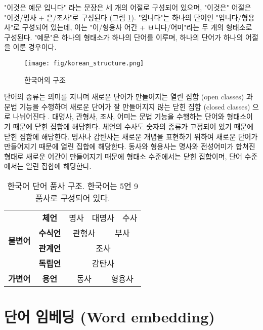 \documentclass[oneside, ko,phd]{snuthesis_utf8_kor}
\begin{document}
"이것은 예문 입니다" 라는 문장은 세 개의 어절로 구성되어 있으며, "이것은" 어절은 "이것/명사 + 은/조사"로 구성된다  (그림 \ref{tab:korean_tag}).
"입니다"는 하나의 단어인 "입니다/형용사"로 구성되어 있는데, 이는 "이/형용사 어간 + ㅂ니다/어미"라는 두 개의 형태소로 구성된다.
"예문"은 하나의 형태소가 하나의 단어를 이루며, 하나의 단어가 하나의 어절을 이룬 경우이다.

\begin{figure}[H]
\centering
\texttt{[image: fig/korean\_structure.png]}
\caption{한국어의 구조}
\label{fig:korean_structure}
\end{figure}

단어의 종류는 의미를 지니며 새로운 단어가 만들어지는 열린 집합 (open classes) 과 문법 기능을 수행하며 새로운 단어가 잘 만들어지지 않는 닫힌 집합 (closed classes) 으로 나뉘어진다 \cite{jurafsky2000speech}.
대명사, 관형사, 조사, 어미는 문법 기능을 수행하는 단어와 형태소이기 때문에 닫힌 집합에 해당한다.
체언의 수사도 숫자의 종류가 고정되어 있기 때문에 닫힌 집합에 해당한다.
명사나 감탄사는 새로운 개념을 표현하기 위하여 새로운 단어가 만들어지기 때문에 열린 집합에 해당한다.
동사와 형용사는 명사와 전성어미가 합쳐진 형태로 새로운 어간이 만들어지기 때문에 형태소 수준에서는 닫힌 집합이며, 단어 수준에서는 열린 집합에 해당한다.

\begin{table}[H]
\centering
\begin{tabular}{|c|c|c|l|c|c|c|l|}
\hline
\multirow{4}{*}{\textbf{불변어}} & \textbf{체언} & \multicolumn{2}{c|}{명사} & \multicolumn{2}{c|}{대명사} & \multicolumn{2}{c|}{수사} \\ \cline{2-8} 
 & \textbf{수식언} & \multicolumn{3}{c|}{관형사} & \multicolumn{3}{c|}{부사} \\ \cline{2-8} 
 & \textbf{관계언} & \multicolumn{6}{c|}{조사} \\ \cline{2-8} 
 & \textbf{독립언} & \multicolumn{6}{c|}{감탄사} \\ \hline
\textbf{가변어} & \textbf{용언} & \multicolumn{3}{c|}{동사} & \multicolumn{3}{c|}{형용사} \\ \hline
\end{tabular}
\caption{한국어 단어 품사 구조. 한국어는 5언 9품사로 구성되어 있다.}
\label{tab:korean_tag}
\end{table}


\section{단어 임베딩 (Word embedding)}
\end{document}

